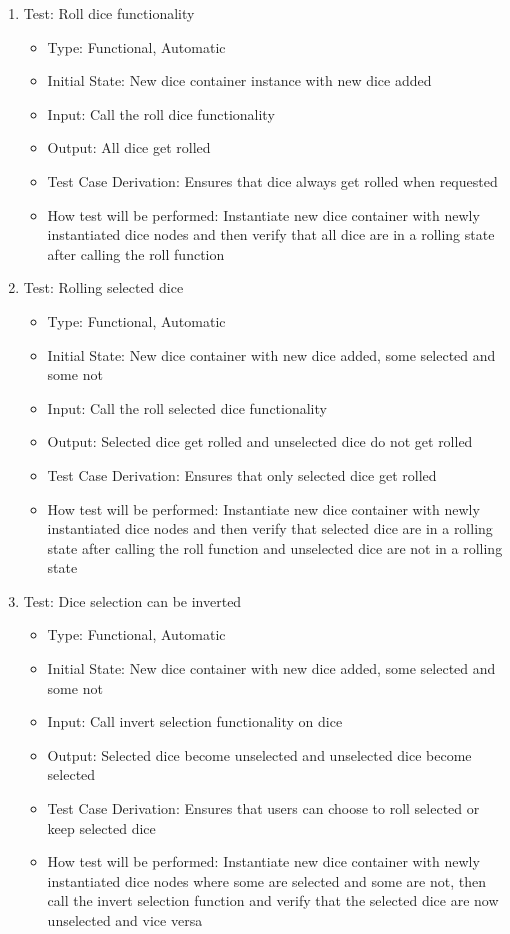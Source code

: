 \documentclass[12pt, titlepage]{article}
\begin{document}
\begin{enumerate}
    \item Test: Roll dice functionality
    \begin{itemize}
        \item Type: Functional, Automatic
        \item Initial State: New dice container instance with new dice added
        \item Input: Call the roll dice functionality
        \item Output: All dice get rolled
        \item Test Case Derivation: Ensures that dice always get rolled when requested
        \item How test will be performed: Instantiate new dice container with newly instantiated dice nodes and then verify that all dice are in a rolling state after calling the roll function
    \end{itemize}
    
    \item Test: Rolling selected dice
    \begin{itemize}
        \item Type: Functional, Automatic
        \item Initial State: New dice container with new dice added, some selected and some not
        \item Input: Call the roll selected dice functionality
        \item Output: Selected dice get rolled and unselected dice do not get rolled
        \item Test Case Derivation: Ensures that only selected dice get rolled
        \item How test will be performed: Instantiate new dice container with newly instantiated dice nodes and then verify that selected dice are in a rolling state after calling the roll function and unselected dice are not in a rolling state
    \end{itemize}

    \item Test: Dice selection can be inverted
    \begin{itemize}
        \item Type: Functional, Automatic
        \item Initial State: New dice container with new dice added, some selected and some not
        \item Input: Call invert selection functionality on dice
        \item Output: Selected dice become unselected and unselected dice become selected
        \item Test Case Derivation: Ensures that users can choose to roll selected or keep selected dice
        \item How test will be performed: Instantiate new dice container with newly instantiated dice nodes where some are selected and some are not, then call the invert selection function and verify that the selected dice are now unselected and vice versa
    \end{itemize}


\end{enumerate}
\end{document}
